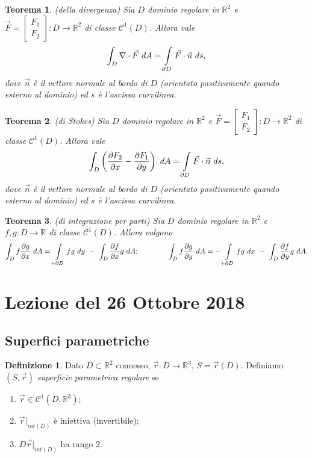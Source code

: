 \documentclass[10pt]{article}
\theoremstyle{plain}
\newtheorem{thm}{Teorema}[section]
\theoremstyle{definition}
\newtheorem{defn}{Definizione}
\begin{document}
\bigskip
\begin{thm} \label{th. divergenza_2dim}
(della divergenza)
Sia $D$ dominio regolare in $\mathbb{R}^2$ e $\vec{F}=\begin{bmatrix}
F_1\\ F_2
\end{bmatrix}:D\to \mathbb{R}^2$  di classe $\mathcal{C}^1(D)$. Allora vale
$$\int_D \nabla \cdot \vec{F} \ dA = \int\displaylimits_{\partial D} \vec{F}\cdot \vec{n} \ ds,
$$
dove $\vec{n}$ è il vettore normale al bordo di $D$ (orientato positivamente quando esterno al dominio) ed $s$ è l'ascissa curvilinea.
\end{thm}
\bigskip
\begin{thm}
(di Stokes)
Sia $D$ dominio regolare in $\mathbb{R}^2$ e $\vec{F}=\begin{bmatrix}
F_1\\ F_2
\end{bmatrix}:D\to \mathbb{R}^2$  di classe $\mathcal{C}^1(D)$. Allora vale
$$\int_D \left( \frac{\partial F_2}{\partial x} - \frac{\partial F_1}{\partial y} \right) \ dA = \int\displaylimits_{\partial D} \vec{F}\cdot \vec{n} \ ds,
$$
dove $\vec{n}$ è il vettore normale al bordo di $D$ (orientato positivamente quando esterno al dominio) ed $s$ è l'ascissa curvilinea.
\end{thm}
\bigskip
\begin{thm}
(di integrazione per parti)
Sia $D$ dominio regolare in $\mathbb{R}^2$ e $f,g:D\to \mathbb{R}$  di classe $\mathcal{C}^1(D)$. Allora valgono
$$\int_Df\frac{\partial g}{\partial x}\ dA = \int\displaylimits_{+\partial D}fg\ dy\ -\ \int_D\frac{\partial f}{\partial x}g\ dA;
\qquad \qquad   \int_Df\frac{\partial g}{\partial y}\ dA = -\int\displaylimits_{+\partial D}fg\ dx\ -\ \int_D\frac{\partial f}{\partial y}g\ dA.
$$
\end{thm}

\section{Lezione del 26 Ottobre 2018}
\subsection{Superfici parametriche}
\begin{defn}
Dato $D\subset \mathbb{R}^2 $ connesso, $\vec{r}:D\to \mathbb{R}^3$, $S=\vec{r}(D)$. Definiamo
$(S,\vec{r})$ \textit{superficie parametrica regolare} se 
\begin{enumerate}
    \item $\vec{r} \in \mathcal{C}^1(D,\mathbb{R}^3)$;
    \item $\vec{r}|_{int(D)}$ è iniettiva (invertibile);
    \item $D\vec{r}|_{int(D)}$ ha rango 2.
\end{enumerate}
\end{defn}
\end{document}
